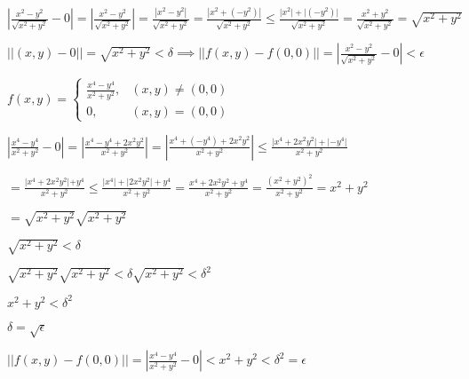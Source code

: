 \documentclass{article}
\def\lthtmlcheckvsize{\ifdim\ht\sizebox<\vsize 
  \ifdim\wd\sizebox<\hsize\expandafter\hfill\fi \expandafter\vfill
  \else\expandafter\vss\fi}%
\begin{document}
{\newpage\clearpage
{}%
$\displaystyle \left \lvert \frac{x^2-y^2}{\sqrt{x^2+y^2}}-0 \right \rvert = \left \lvert \frac{x^2-y^2}{\sqrt{x^2+y^2}} \right \rvert =  \frac{\left \lvert x^2-y^2 \right \rvert}{\sqrt{x^2+y^2}}= \frac{\left \lvert x^2+(-y^2) \right \rvert}{\sqrt{x^2+y^2}}  \leq \frac{ \lvert x^2 \rvert+\lvert (-y^2)  \rvert}{\sqrt{x^2+y^2}} = \frac{x^2+y^2}{\sqrt{x^2+y^2}} = \sqrt{x^2+y^2}$%
\lthtmlindisplaymathZ
\lthtmlcheckvsize\clearpage}

{\newpage\clearpage
{}%
$ \lvert \lvert (x,y)-0 \rvert \rvert = \sqrt{x^2+y^2} < \delta \implies \lvert \lvert f(x,y) - f(0,0) \rvert \rvert = \left \lvert \frac{x^2-y^2}{\sqrt{x^2+y^2}}-0 \right \rvert < \epsilon$%
\lthtmlindisplaymathZ
\lthtmlcheckvsize\clearpage}

{\newpage\clearpage
{}%
$\displaystyle f(x,y) = \begin{cases}
\frac{x^4-y^4}{x^2+y^2}, & (x,y) \neq (0,0) \\
0, & (x,y) = (0,0) \end{cases}$%
\lthtmlindisplaymathZ
\lthtmlcheckvsize\clearpage}

{\newpage\clearpage
{}%
$\displaystyle \left \lvert \frac{x^4-y^4}{x^2+y^2}-0 \right \rvert = \left \lvert \frac{x^4-y^4+2x^2y^2}{x^2+y^2} \right \rvert =  \left \lvert \frac{x^4+(-y^4)+2x^2y^2}{x^2+y^2} \right \rvert \leq  \frac{\lvert x^4+2x^2y^2\rvert+\lvert-y^4\rvert}{x^2+y^2} $%
\lthtmlindisplaymathZ
\lthtmlcheckvsize\clearpage}

{\newpage\clearpage
{}%
$\displaystyle =  \frac{\lvert x^4+2x^2y^2 \lvert+y^4}{x^2+y^2}  \leq  \frac{\lvert x^4 \rvert +\lvert 2x^2y^2 \rvert+y^4}{x^2+y^2} =  \frac{ x^4+2x^2y^2+y^4}{x^2+y^2} = \frac{ (x^2+y^2)^2}{x^2+y^2} = x^2+y^2$%
\lthtmlindisplaymathZ
\lthtmlcheckvsize\clearpage}

{\newpage\clearpage
{}%
$\displaystyle = \sqrt{x^2+y^2} \sqrt{x^2+y^2} $%
\lthtmlindisplaymathZ
\lthtmlcheckvsize\clearpage}

{\newpage\clearpage
{}%
$ \sqrt{x^2+y^2}<\delta$%
\lthtmlindisplaymathZ
\lthtmlcheckvsize\clearpage}

{\newpage\clearpage
{}%
$ \sqrt{x^2+y^2}\sqrt{x^2+y^2}<\delta\sqrt{x^2+y^2}<\delta^2$%
\lthtmlindisplaymathZ
\lthtmlcheckvsize\clearpage}

{\newpage\clearpage
{}%
$ x^2+y^2<\delta^2$%
\lthtmlindisplaymathZ
\lthtmlcheckvsize\clearpage}

{\newpage\clearpage
{}%
$ \delta=\sqrt{\epsilon}$%
\lthtmlindisplaymathZ
\lthtmlcheckvsize\clearpage}

{\newpage\clearpage
{}%
$\displaystyle \lvert \lvert f(x,y) - f(0,0) \rvert \rvert = \left \lvert \frac{x^4-y^4}{x^2+y^2}-0 \right \rvert < x^2+y^2 < \delta^2 = \epsilon$%
\lthtmlindisplaymathZ
\lthtmlcheckvsize\clearpage}
\end{document}
